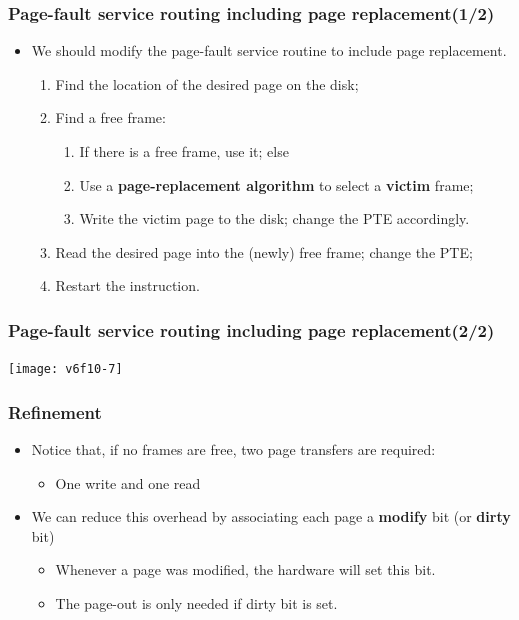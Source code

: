 \documentclass[CJKutf8,xcolor=pdftex,dvipsnames,table]{beamer}
\begin{document}
\begin{CJK*}{UTF8}{song}
  \begin{frame}
    \frametitle{Page-fault service routing including page replacement(1/2)} \pause
    \begin{itemize}
    \item{We should modify the page-fault service routine to include page replacement.} \pause
      \begin{enumerate}
      \item{Find the location of the desired page on the disk;} \pause
      \item{Find a free frame: } \pause
        \begin{enumerate}
        \item{If there is a free frame, use it; else} \pause
        \item{Use a \textbf{page-replacement algorithm} to select a \textbf{victim} frame;} \pause
        \item{Write the victim page to the disk; change the PTE accordingly.} \pause
        \end{enumerate}
      \item{Read the desired page into the (newly) free frame; change the PTE;} \pause
      \item{Restart the instruction.}
      \end{enumerate}
    \end{itemize}
  \end{frame}
  
  \begin{frame}
    \frametitle{Page-fault service routing including page replacement(2/2)} \pause
    \begin{center}
      \texttt{[image: v6f10-7]}
    \end{center}
  \end{frame}
  
  \begin{frame}
    \frametitle{Refinement} \pause
    \begin{itemize}
    \item{Notice that, if no frames are free, two page transfers are required: } \pause
      \begin{itemize}
      \item{One write and one read} \pause
      \end{itemize}
    \item{We can reduce this overhead by associating each page a \textbf{modify} bit (or \textbf{dirty} bit)} \pause
      \begin{itemize}
      \item{Whenever a page was modified, the hardware will set this bit.} \pause
      \item{The page-out is only needed if dirty bit is set.}
      \end{itemize}
    \end{itemize}
  \end{frame}
  

\end{CJK*}
\end{document}
